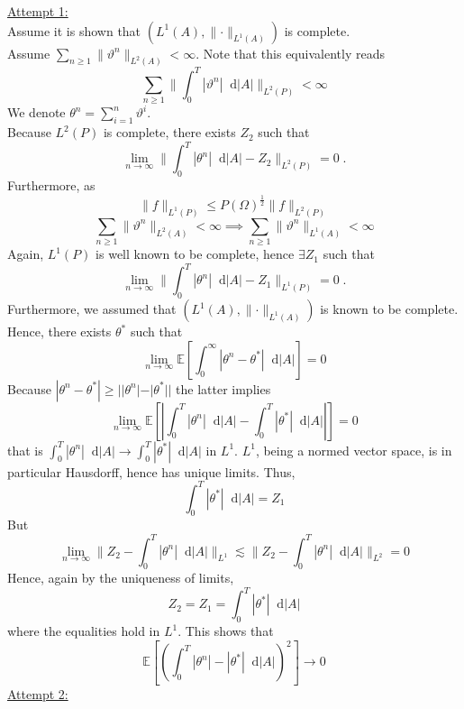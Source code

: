 \documentclass[11pt]{report}
\newcommand{\diff}{\mathop{}\!\mathrm{d}}
\theoremstyle{plain} %
\theoremstyle{definition} %
\theoremstyle{remark} %
\begin{document}
 \bigbreak
 \underline{Attempt 1:}
 \\
 Assume it is shown that \((L^1(A),\lVert\cdot\rVert_{L^1(A)})\) is complete. 
 \\
 Assume \(\sum_{n\geq 1}\lVert \vartheta^n\rVert_{L^2(A)}<\infty\). Note that this equivalently reads
 \begin{equation}
     \sum_{n\geq 1}\lVert\int_0^T|\vartheta^n|\diff |A|\rVert_{L^2(P)}<\infty
 \end{equation}
 We denote \(\theta^n = \sum_{i=1}^n\vartheta^i\).
 \\
 Because \(L^2(P)\) is complete, there exists \(Z_2\) such that 
 \begin{equation}
     \lim_{n\to\infty}\lVert\int_0^T|\theta^n|\diff |A|-Z_2\rVert_{L^2(P)}=0\;.
 \end{equation}
 Furthermore, as
 \begin{equation}
     \lVert f\rVert_{L^1(P)}\leq P(\Omega)^{\frac{1}{2}}\lVert f\rVert_{L^2(P)}
 \end{equation}
 \begin{equation}
     \sum_{n\geq 1}\lVert \vartheta^n\rVert_{L^2(A)}<\infty\implies\sum_{n\geq 1}\lVert \vartheta^n\rVert_{L^1(A)}<\infty
 \end{equation}
 Again, \(L^1(P)\) is well known to be complete, hence \(\exists Z_1\) such that
  \begin{equation}
     \lim_{n\to\infty}\lVert\int_0^T|\theta^n|\diff |A|-Z_1\rVert_{L^1(P)}=0\;.
 \end{equation}
 Furthermore, we assumed that \((L^1(A),\lVert\cdot\rVert_{L^1(A)})\) is known to be complete. Hence, there exists \(\theta^*\) such that 
 \begin{equation}
     \lim_{n\to\infty}\mathbb{E}[\int_0^\infty|\theta^n-\theta^*|\diff |A|]=0
 \end{equation}
 Because \(|\theta^n-\theta^*|\geq ||\theta^n|-|\theta^*||\) the latter implies
 \begin{equation}
     \lim_{n\to\infty}\mathbb{E}[\left|\int_0^T|\theta^n|\diff |A|-\int_0^T|\theta^*|\diff |A|\right|]=0
 \end{equation}
 that is \(\int_0^T|\theta^n|\diff |A|\to\int_0^T|\theta^*|\diff |A|\) in \(L^1\). \(L^1\), being a normed vector space, is in particular Hausdorff, hence has unique limits. Thus, 
 \begin{equation}
     \int_0^T|\theta^*|\diff |A|=Z_1
 \end{equation}
 But 
 \begin{equation}
     \lim_{n\to\infty}\lVert Z_2-\int_0^T|\theta^n|\diff |A|\rVert_{L^1}\lesssim \lVert Z_2-\int_0^T|\theta^n|\diff |A|\rVert_{L^2}=0
 \end{equation}
 Hence, again by the uniqueness of limits, 
 \begin{equation}
     Z_2=Z_1=\int_0^T|\theta^*|\diff |A|
 \end{equation}
 where the equalities hold in \(L^1\). 
 This shows that
 \begin{equation}
     \mathbb{E}[\left(\int_0^T|\theta^n|-|\theta^*|\diff |A|\right)^2]\to0
 \end{equation}
 \bigbreak
 \underline{Attempt 2:}
 
\end{document}
